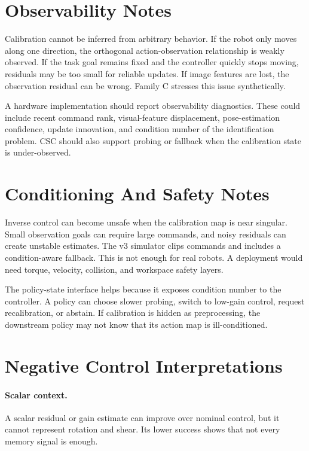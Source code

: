\documentclass{article}
\begin{document}
\section{Observability Notes}

Calibration cannot be inferred from arbitrary behavior. If the robot only
moves along one direction, the orthogonal action-observation relationship is
weakly observed. If the task goal remains fixed and the controller quickly
stops moving, residuals may be too small for reliable updates. If image
features are lost, the observation residual can be wrong. Family C stresses
this issue synthetically.

A hardware implementation should report observability diagnostics. These could
include recent command rank, visual-feature displacement, pose-estimation
confidence, update innovation, and condition number of the identification
problem. CSC should also support probing or fallback when the calibration state
is under-observed.

\section{Conditioning And Safety Notes}

Inverse control can become unsafe when the calibration map is near singular.
Small observation goals can require large commands, and noisy residuals can
create unstable estimates. The v3 simulator clips commands and includes a
condition-aware fallback. This is not enough for real robots. A deployment
would need torque, velocity, collision, and workspace safety layers.

The policy-state interface helps because it exposes condition number to the
controller. A policy can choose slower probing, switch to low-gain control,
request recalibration, or abstain. If calibration is hidden as preprocessing,
the downstream policy may not know that its action map is ill-conditioned.

\section{Negative Control Interpretations}

\paragraph{Scalar context.}
A scalar residual or gain estimate can improve over nominal control, but it
cannot represent rotation and shear. Its lower success shows that not every
memory signal is enough.
\end{document}
